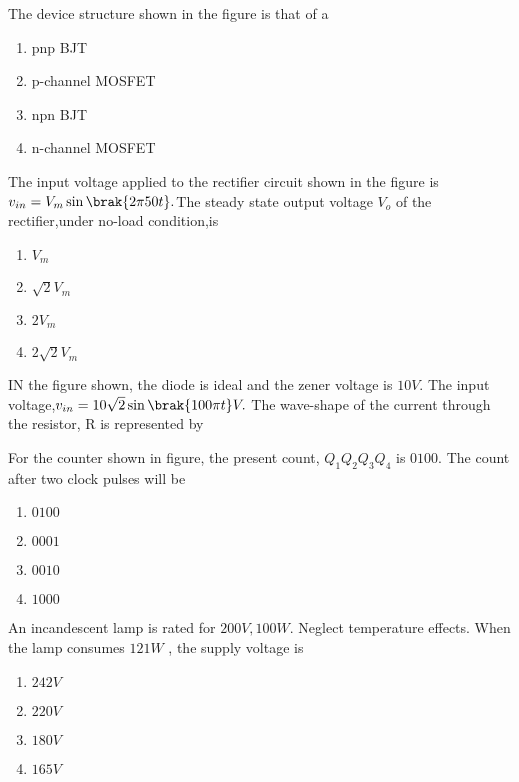     \item The device structure shown in the figure is that of a 
    \begin{enumerate}
        \item pnp BJT
        \item p-channel MOSFET
        \item npn BJT
        \item n-channel MOSFET \\
    \end{enumerate}

    \item The input voltage applied to the rectifier circuit shown in the figure is $v_{in}=V_{m}\sin\brak{2\pi50t}.$The steady state output voltage $V_{o}$ of the rectifier,under no-load condition,is
    \begin{enumerate}
        \item $V_{m}$
        \item $\sqrt{2} V_{m}$
        \item $2 V_{m}$
        \item $2 \sqrt{2}V_{m}$ \\   
    \end{enumerate}

    \item IN the figure shown, the diode is ideal and the zener voltage is $10 V.$ The input voltage,$v_{in} = 10 \sqrt{2}\sin\brak{100\pi t} V.$ The wave-shape of the current through the resistor, R is represented by 
    


    \item For the counter shown in figure, the present count, $Q_{1}Q_{2}Q_{3}Q_{4}$ is $0100.$ The count after two clock pulses will be 
    \begin{enumerate}
        \item $0100$
        \item $0001$
        \item $0010$
        \item $1000$\\
    \end{enumerate}

    \item An incandescent lamp is rated for $200 V ,100 W$. Neglect temperature effects. When the lamp consumes $121 W$ , the supply voltage is 
    \begin{enumerate}
        \item $242 V$
        \item $220 V$
        \item $180 V$
        \item $165 V$\\
    \end{enumerate}

